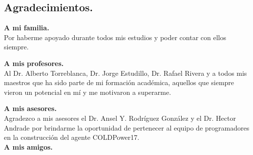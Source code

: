 \begin{center}
	\section*{Agradecimientos.}   
\end{center}
\setcounter{page}{1}

\textbf{A mi familia.}\\
Por haberme apoyado durante todos mis estudios y poder contar con ellos siempre.

\textbf{A mis profesores.}
\\
Al Dr. Alberto Torreblanca, Dr. Jorge Estudillo, Dr. Rafael Rivera
y a todos mis maestros que ha sido parte de mi formación académica, aquellos que siempre vieron un potencial en mí y me motivaron a superarme.	

\textbf{A mis asesores.}\\
Agradezco a mis asesores el Dr. Ansel Y. Rodríguez González y el Dr. Hector Andrade por brindarme la oportunidad de pertenecer al equipo de programadores en la construcción del agente COLDPower17.
\\

\textbf{A mis amigos.}
